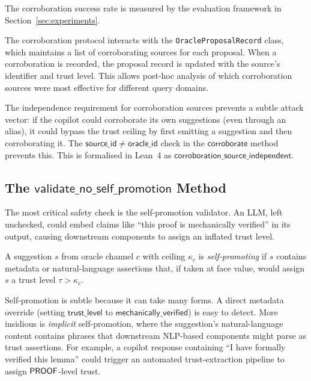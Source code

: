\documentclass[11pt]{article}
\newcommand{\OPRec}{\texttt{OracleProposalRecord}}
\begin{document}
The corroboration success rate is measured by the evaluation
framework in Section~\ref{sec:experiments}.

The corroboration protocol interacts with the \OPRec{} class, which
maintains a list of corroborating sources for each proposal.  When
a corroboration is recorded, the proposal record is updated with
the source's identifier and trust level.  This allows post-hoc
analysis of which corroboration sources were most effective for
different query domains.

\begin{remark}
The independence requirement for corroboration sources prevents a
subtle attack vector: if the copilot could corroborate its own
suggestions (even through an alias), it could bypass the trust
ceiling by first emitting a suggestion and then corroborating it.
The $\mathsf{source\_id} \ne \mathsf{oracle\_id}$ check in the
$\mathsf{corroborate}$ method prevents this.  This is formalised
in Lean~4 as $\mathsf{corroboration\_source\_independent}$.
\end{remark}

\subsection{The \texorpdfstring{$\mathsf{validate\_no\_self\_promotion}$}%
  {validate\_no\_self\_promotion} Method}\label{sec:selfpromo}

The most critical safety check is the self-promotion validator.
An LLM, left unchecked, could embed claims like ``this proof is
mechanically verified'' in its output, causing downstream components
to assign an inflated trust level.

\begin{definition}\label{def:selfpromo}
A suggestion $s$ from oracle channel $c$ with ceiling $\kappa_c$
is \emph{self-promoting} if $s$ contains metadata or natural-language
assertions that, if taken at face value, would assign $s$ a trust
level $\tau > \kappa_c$.
\end{definition}

Self-promotion is subtle because it can take many forms.  A direct
metadata override (setting $\mathsf{trust\_level}$ to
$\mathsf{mechanically\_verified}$) is easy to detect.  More
insidious is \emph{implicit} self-promotion, where the suggestion's
natural-language content contains phrases that downstream
NLP-based components might parse as trust assertions.  For example,
a copilot response containing ``I have formally verified this
lemma'' could trigger an automated trust-extraction pipeline to
assign $\mathsf{PROOF}$-level trust.
\end{document}
